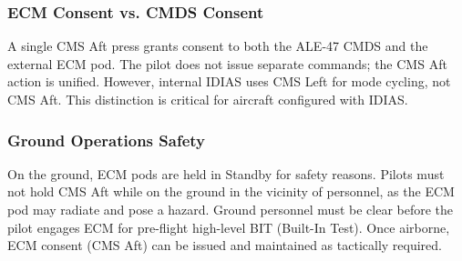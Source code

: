 \documentclass[11pt,a4paper]{article}
\begin{document}
\subsubsection*{ECM Consent vs. CMDS Consent}

A single CMS Aft press grants consent to both the ALE-47 CMDS and the external ECM pod. The pilot does not issue separate commands; the CMS Aft action is unified. However, internal IDIAS uses CMS Left for mode cycling, not CMS Aft. This distinction is critical for aircraft configured with IDIAS.

\subsubsection*{Ground Operations Safety}

On the ground, ECM pods are held in Standby for safety reasons. Pilots must not hold CMS Aft while on the ground in the vicinity of personnel, as the ECM pod may radiate and pose a hazard. Ground personnel must be clear before the pilot engages ECM for pre-flight high-level BIT (Built-In Test). Once airborne, ECM consent (CMS Aft) can be issued and maintained as tactically required.

\end{document}

